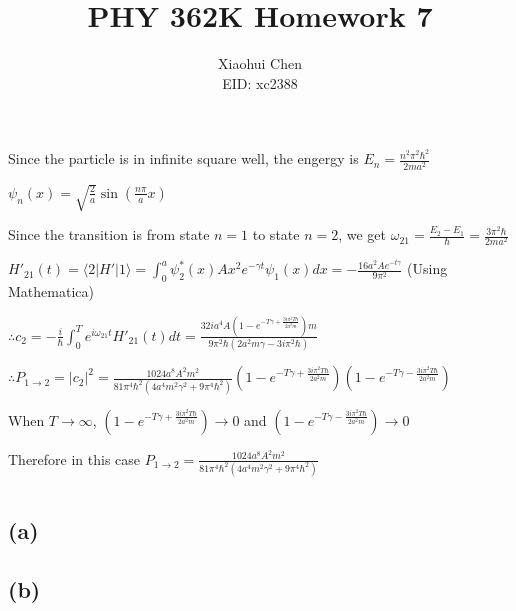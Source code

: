 \documentclass[12pt]{article}
\author{Xiaohui Chen \\EID: xc2388}
\title{PHY 362K Homework 7}
\begin{document}
\maketitle

\begin{spacing}{2.0}

\section{} %

Since the particle is in infinite square well, the engergy is $E_n= \frac{n^2 \pi^2 \hbar^2}{2ma^2}$

$\psi_n(x)= \sqrt{\frac{2}{a}} \sin \left( \frac{n\pi}{a}x  \right)$

Since the transition is from state $n=1$ to state $n=2$, we get $\omega_{21} = \frac{E_2-E_1}{\hbar} = \frac{3\pi^2 \hbar}{2ma^2}$

$H'_{21}(t) = \langle 2| H'|1 \rangle  = \int_{0}^{a} \psi_2^*(x) Ax^2e^{-\gamma t} \psi_1(x) dx = -\frac{16 a^2 A e^{-t \gamma }}{9 \pi ^2}  $ (Using Mathematica)

$\therefore c_2 = -\frac{i}{\hbar} \int_{0}^{T} e^{i\omega_{21}t } H'_{21}(t) dt = \frac{32 i a^4 A \left(1-e^{-T \gamma +\frac{3 i \pi ^2 T \hbar }{2 a^2 m}}\right) m}{9 \pi ^2 \hbar  \left(2 a^2 m \gamma -3 i \pi ^2 \hbar \right)} $

$\therefore P_{1 \rightarrow 2} = |c_2|^2 = \frac{1024 a^8 A^2 m^2}{81\pi^4 \hbar^2(4a^4 m^2\gamma^2 + 9\pi^4\hbar^2)} \left(1-e^{-T \gamma +\frac{3 i \pi ^2 T \hbar }{2 a^2 m}}\right) \left(1-e^{-T \gamma -\frac{3 i \pi ^2 T \hbar }{2 a^2 m}}\right)$

When $T \rightarrow \infty$, $ \left(1-e^{-T \gamma +\frac{3 i \pi ^2 T \hbar }{2 a^2 m}}\right) \rightarrow 0 $ and $ \left(1-e^{-T \gamma -\frac{3 i \pi ^2 T \hbar }{2 a^2 m}}\right) \rightarrow 0 $

Therefore in this case $P_{1 \rightarrow 2} = \frac{1024 a^8 A^2 m^2}{81\pi^4 \hbar^2(4a^4 m^2\gamma^2 + 9\pi^4\hbar^2)}$

\section{} %

\subsection*{(a)}

\subsection*{(b)}


\end{spacing}
\end{document}
